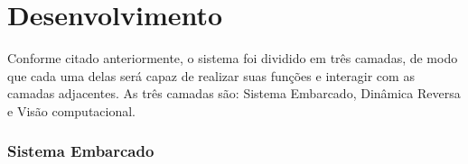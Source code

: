 \documentclass[12pt,openright,oneside,a4paper,brazil]{abntex2}
\begin{document}
\chapter{Desenvolvimento}

Conforme citado anteriormente, o sistema foi dividido em três camadas, de modo que cada uma delas será capaz de realizar suas funções e interagir com as camadas adjacentes. As três camadas são: Sistema Embarcado, Dinâmica Reversa e Visão computacional.

\subsection{Sistema Embarcado}



%
%
%
%
\end{document}
